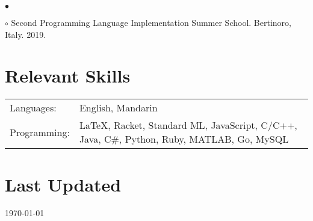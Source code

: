 \documentclass[margin,line]{res}
\newenvironment{list2}{
  \begin{list}{$\bullet$}{%
      \setlength{\itemsep}{0in}
      \setlength{\parsep}{0in} \setlength{\parskip}{0in}
      \setlength{\topsep}{0in} \setlength{\partopsep}{0in}
      \setlength{\leftmargin}{0.2in}}}{\end{list}}
\begin{document}
\begin{resume}
\begin{list2}
\item[$\circ$] Second Programming Language Implementation Summer School. Bertinoro, Italy. 2019.
\end{list2}


\section{\sc Relevant Skills}

\vspace{.05in}
\begin{tabular}{@{}p{0.8in}p{4.25in}}

Languages:& English, Mandarin \\
Programming:& \LaTeX, Racket, Standard ML, JavaScript, C/C++, Java, C\#, Python, Ruby, MATLAB, Go, MySQL

\end{tabular}


\section{\sc Last Updated}
\today


\end{resume}
\end{document}
